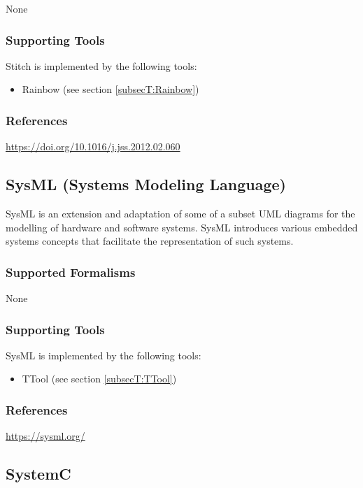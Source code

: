 None


\subsubsection{Supporting Tools}

Stitch is implemented by the following tools:
\begin{itemize}
	\item Rainbow (see section \ref{subsecT:Rainbow})
\end{itemize}


\subsubsection{References}

\url{https://doi.org/10.1016/j.jss.2012.02.060}



\subsection{SysML (Systems Modeling Language)}
\label{subsecL:SysML}

SysML is an extension and adaptation of some of a subset UML diagrams for the modelling of hardware and software systems.
SysML introduces various embedded systems concepts that facilitate the representation of such systems.

\subsubsection{Supported Formalisms}

None


\subsubsection{Supporting Tools}

SysML is implemented by the following tools:
\begin{itemize}
	\item TTool (see section \ref{subsecT:TTool})
\end{itemize}


\subsubsection{References}
\url{https://sysml.org/}



\subsection{SystemC}
\label{subsecL:SystemC}


